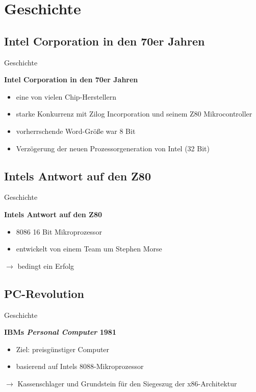 \section{Geschichte}

\subsection{Intel Corporation in den 70er Jahren}
\begin{frame}{Geschichte}
	\begin{center}
		\textbf{Intel Corporation in den 70er Jahren}
	\end{center}
	\begin{itemize}
		\item eine von vielen Chip-Herstellern
		\item starke Konkurrenz mit Zilog Incorporation und seinem Z80 Mikrocontroller
		\item vorherrschende Word-Größe war 8 Bit
		\item Verzögerung der neuen Prozessorgeneration von Intel (32 Bit)
	\end{itemize}
\end{frame}

\subsection{Intels Antwort auf den Z80}
\begin{frame}{Geschichte}
	\begin{center}
		\textbf{Intels Antwort auf den Z80}
	\end{center}
	\begin{itemize}
		\item 8086 16 Bit Mikroprozessor
	 	\item entwickelt von einem Team um Stephen Morse 
	\end{itemize}

	$\rightarrow$ bedingt ein Erfolg
\end{frame}

\subsection{PC-Revolution}
\begin{frame}{Geschichte}
	\begin{center}
		\textbf{IBMs \textit{Personal Computer}	1981}
	\end{center}

	\begin{itemize}
		\item Ziel: preisgünstiger Computer
		\item basierend auf Intels 8088-Mikroprozessor
	\end{itemize}

	$\rightarrow$ Kassenschlager und Grundstein für den Siegeszug der x86-Architektur 
\end{frame}

